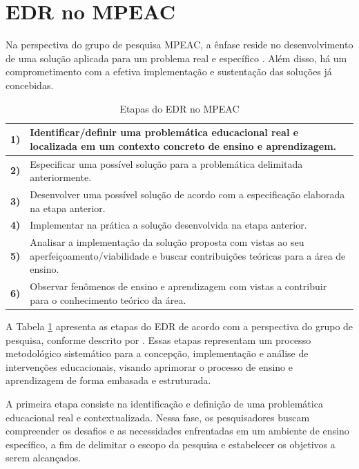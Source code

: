 \section{EDR no MPEAC} \label{ch:edrmpeac}

Na perspectiva do grupo de pesquisa MPEAC, a ênfase reside no desenvolvimento de uma solução aplicada para um problema real e específico \cite{alves2018}. Além disso, há um comprometimento com a efetiva implementação e sustentação das soluções já concebidas.

\begin{table}[H]
\ABNTEXfontereduzida %
\centering %
\caption{Etapas do EDR no MPEAC}
\label{tab:etapas-edr-mpeac}
\begin{tabularx}{\linewidth}{@{}lX@{}} %
\toprule
\textbf{1)} & Identificar/definir uma problemática educacional real e localizada em um contexto concreto de ensino e aprendizagem.\\
\midrule
\textbf{2)} & Especificar uma possível solução para a problemática delimitada anteriormente.\\
\midrule
\textbf{3)} & Desenvolver uma possível solução de acordo com a especificação elaborada na etapa anterior.\\
\midrule
\textbf{4)} & Implementar na prática a solução desenvolvida na etapa anterior.\\
\midrule
\textbf{5)} & Analisar a implementação da solução proposta com vistas ao seu aperfeiçoamento/viabilidade e buscar contribuições teóricas para a área de ensino.\\
\midrule
\textbf{6)} & Observar fenômenos de ensino e aprendizagem com vistas a contribuir para o conhecimento teórico da área.\\
\bottomrule
\end{tabularx}
\end{table}

A Tabela \ref{tab:etapas-edr-mpeac} apresenta as etapas do EDR de acordo com a perspectiva do grupo de pesquisa, conforme descrito por . Essas etapas representam um processo metodológico sistemático para a concepção, implementação e análise de intervenções educacionais, visando aprimorar o processo de ensino e aprendizagem de forma embasada e estruturada.

A primeira etapa consiste na identificação e definição de uma problemática educacional real e contextualizada. Nessa fase, os pesquisadores buscam compreender os desafios e as necessidades enfrentadas em um ambiente de ensino específico, a fim de delimitar o escopo da pesquisa e estabelecer os objetivos a serem alcançados.

